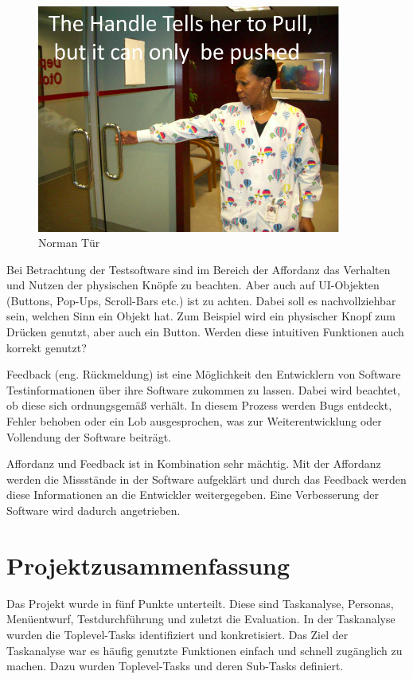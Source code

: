 \documentclass{TUBAFarbeiten}
\begin{document}
\begin{figure}
	\centering
	\includegraphics[width=10cm]{norman.png}
	\caption{Norman Tür}
	\label{fig:norman}
\end{figure}

Bei Betrachtung der Testsoftware sind im Bereich der Affordanz das Verhalten und Nutzen der physischen Knöpfe zu beachten. 
Aber auch auf UI-Objekten (Buttons, Pop-Ups, Scroll-Bars etc.) ist zu achten. Dabei soll es nachvollziehbar sein, welchen Sinn ein Objekt hat. Zum Beispiel wird ein physischer Knopf zum Drücken genutzt, aber auch ein Button. Werden diese intuitiven Funktionen auch korrekt genutzt?

Feedback (eng. Rückmeldung) ist eine Möglichkeit den Entwicklern von Software Testinformationen über ihre Software zukommen zu lassen. Dabei wird beachtet, ob diese sich ordnungsgemäß verhält. In diesem Prozess werden Bugs entdeckt, Fehler behoben oder ein Lob ausgesprochen, was zur Weiterentwicklung oder Vollendung der Software beiträgt.

Affordanz und Feedback ist in Kombination sehr mächtig. Mit der Affordanz werden die Missstände in der Software aufgeklärt und durch das Feedback werden diese Informationen an die Entwickler weitergegeben. Eine Verbesserung der Software wird dadurch angetrieben.

\newpage
\section{Projektzusammenfassung}
Das Projekt wurde in fünf Punkte unterteilt. Diese sind Taskanalyse, Personas, Menüentwurf, Testdurchführung und zuletzt die Evaluation. In der Taskanalyse wurden die Toplevel-Tasks identifiziert und konkretisiert. Das Ziel der Taskanalyse war es häufig genutzte Funktionen einfach und schnell zugänglich zu machen. Dazu wurden Toplevel-Tasks und deren Sub-Tasks definiert. 
\end{document}
